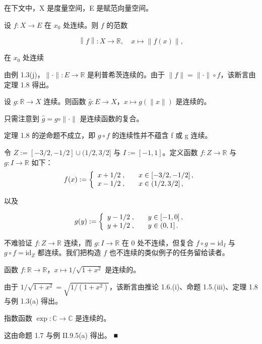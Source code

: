 \begin{example}

在下文中，X 是度量空间，E 是赋范向量空间。

\begin{items}
\item

设 $ f: X \to E $ 在 $ x_0 $ 处连续。则 $ f $ 的范数

\[
\left\|f\right\|:X\to\mathbb{R},\quad x\mapsto\left\|f(x)\right\|,
\]

在 $ x_{0} $ 处连续

\proofhead
由例 1.3(j)，$ \|\cdot\|: E \to \mathbb{R} $ 是利普希茨连续的。由于 $ \|f\| = \|\cdot\| \circ f $，该断言由定理 1.8 得出。
\item

设 $ g: \mathbb{R} \to X $ 连续。则函数 $ \widehat{g}: E \to X $，$ x \mapsto g(\|x\|) $ 是连续的。

\proofhead
只需注意到 $ \widehat{g} = g \circ \|\cdot\| $ 是连续函数的复合。
\item

定理 1.8 的逆命题不成立，即 $ g \circ f $ 的连续性并不蕴含 f 或 g 连续。

\proofhead
令 $ Z := [-3/2, -1/2] \cup (1/2, 3/2] $ 与 $ I := [-1, 1] $。定义函数 $ f: Z \to \mathbb{R} $ 与 $ g: I \to \mathbb{R} $ 如下：
\begin{equation*}
f(x):=\left\{\begin{array}{l l}{x+1/2\;,}&{\quad x\in\left[-3/2,-1/2\right],}\\ {x-1/2\;,}&{\quad x\in\left(1/2,3/2\right],}\end{array}\right.
\end{equation*}

以及

\begin{equation*}
g(y):=\left\{\begin{array}{l l}{y-1/2\;,}&{\quad y\in\left[-1,0\right],}\\ {y+1/2\;,}&{\quad y\in\left(0,1\right].}\end{array}\right.
\end{equation*}

不难验证 $ f: Z \to \mathbb{R} $ 连续，而 $ g: I \to \mathbb{R} $ 在 0 处不连续，但复合 $ f \circ g = \mathrm{id}_I $ 与 $ g \circ f = \mathrm{id}_Z $ 都连续。我们把构造 $ f $ 也不连续的类似例子的任务留给读者。

\item

函数 $ f: \mathbb{R} \to \mathbb{R} $，$ x \mapsto 1 / \sqrt{1 + x^2} $ 是连续的。

\proofhead
由于 $ 1/\sqrt{1+x^2} = \sqrt{1/(1+x^2)} $，该断言由推论 1.6.(i)、命题 1.5.(iii)、定理 1.8 与例 1.3(a) 得出。
\item

指数函数 $ \exp: \mathbb{C} \to \mathbb{C} $ 是连续的。

\proofhead
这由命题 1.7 与例 II.9.5(a) 得出。 ■
\end{items}

\end{example}


